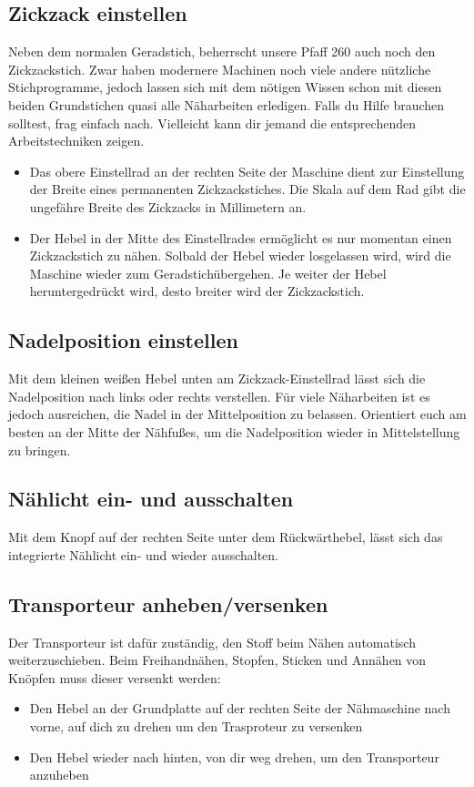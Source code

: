 \documentclass{\basedir/fablab-document}
\begin{document}
\subsection{Zickzack einstellen}
Neben dem normalen Geradstich, beherrscht unsere Pfaff 260 auch noch den Zickzackstich. 
Zwar haben modernere Machinen noch viele andere nützliche Stichprogramme, jedoch lassen sich mit dem nötigen Wissen schon mit diesen beiden Grundstichen quasi alle Näharbeiten erledigen. Falls du Hilfe brauchen solltest, frag einfach nach. Vielleicht kann dir jemand die entsprechenden Arbeitstechniken zeigen.  
\begin{itemize}
	\item Das obere Einstellrad an der rechten Seite der Maschine dient zur Einstellung der Breite eines permanenten Zickzackstiches. Die Skala auf dem Rad gibt die ungefähre Breite des Zickzacks in Millimetern an.
	\item Der Hebel in der Mitte des Einstellrades ermöglicht es nur momentan einen Zickzackstich zu nähen.
	Solbald der Hebel wieder losgelassen wird, wird die Maschine wieder zum Geradstichübergehen. 
	Je weiter der Hebel heruntergedrückt wird, desto breiter wird der Zickzackstich.
\end{itemize}

\subsection{Nadelposition einstellen}
Mit dem kleinen weißen Hebel unten am Zickzack-Einstellrad lässt sich die Nadelposition nach links oder rechts verstellen.
Für viele Näharbeiten ist es jedoch ausreichen, die Nadel in der Mittelposition zu belassen.
Orientiert euch am besten an der Mitte der Nähfußes, um die Nadelposition wieder in Mittelstellung zu bringen.

\subsection{Nählicht ein- und ausschalten}
Mit dem Knopf auf der rechten Seite unter dem Rückwärthebel, lässt sich das integrierte Nählicht ein- und wieder ausschalten.

\subsection{Transporteur anheben/versenken}
Der Transporteur ist dafür zuständig, den Stoff beim Nähen automatisch weiterzuschieben. 
\newline Beim Freihandnähen, Stopfen, Sticken und Annähen von Knöpfen muss dieser versenkt werden:
\begin{itemize}
	\item Den Hebel an der Grundplatte auf der rechten Seite der Nähmaschine nach vorne, auf dich zu drehen um den Trasproteur zu versenken
	\item Den Hebel wieder nach hinten, von dir weg drehen, um den Transporteur anzuheben
\end{itemize}
\end{document}
